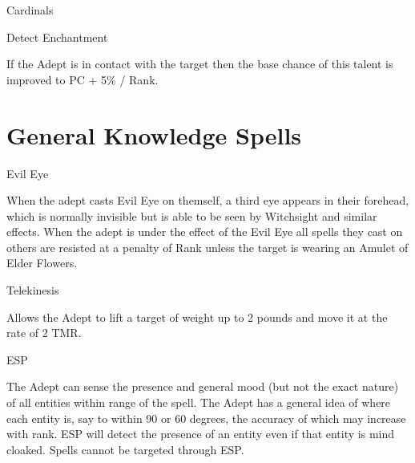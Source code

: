 \documentclass{report}
\begin{document}
\begin{College}{Cardinals}
\begin{talent}[T-2]{Detect Enchantment}
\begin{effects}
If the Adept is in contact with the target then the base chance of
this talent is improved to PC + 5\% / Rank.
\end{effects}
\end{talent}

\section{General Knowledge Spells}

\begin{spell}[G-1]{Evil Eye}

\begin{effects}
When the adept casts Evil Eye on themself, a third eye appears in
their forehead, which is normally invisible but is able to be seen by
Witchsight and similar effects.  When the adept is under the effect of
the Evil Eye all spells they cast on others are resisted at a penalty
of Rank unless the target is wearing an Amulet of Elder Flowers.
\end{effects}
\end{spell}


\begin{spell}[G-2]{Telekinesis}
\begin{effects}
Allows the Adept to lift a target of weight up to 2 pounds and move it
at the rate of 2 TMR.
\end{effects}
\end{spell}

\begin{spell}[G-3]{ESP}
\begin{effects}
The Adept can sense the presence and general mood (but not the exact
nature) of all entities within range of the spell.  The Adept has a
general idea of where each entity is, say to within 90 or 60 degrees,
the accuracy of which may increase with rank.  ESP will detect the
presence of an entity even if that entity is mind cloaked. Spells
cannot be targeted through ESP.
\end{effects}
\end{spell}
\end{College}
\end{document}
